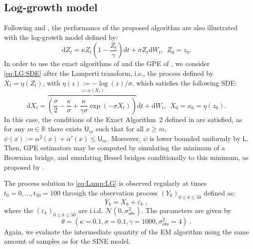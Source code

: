 \documentclass[12pt,draft]{article}
\newcommand{\rmd}{\mathrm{d}}
\newcommand{\eqsp}{\;}
\newcommand{\1}{\mathrm{1}}
\begin{document}
\subsection*{Log-growth model}
Following \cite{beskos:papaspiliopoulos:roberts:fearnhead:2006} and \cite{olsson:westerborn:2016}, the performance of the proposed algorithm are also illustrated with the log-growth model defined by:
\begin{equation}
\rmd Z_t = \kappa Z_t\left(1-\frac{Z_t}{\gamma}\right)\rmd t + \sigma Z_t \rmd W_t,~~Z_0=z_0. \label{eq:LG:SDE}
\end{equation}
In order to use the exact algorithms of \cite{beskos:papaspiliopoulos:roberts:fearnhead:2006} and the GPE of \cite{fearnhead:papaspiliopoulos:roberts:2008}, we consider  \eqref{eq:LG:SDE} after the Lamperti transform, i.e., the process defined by $X_t=\eta(Z_t)$, with $\eta(z) := -\log (z)/\sigma$,  which satisfies the following SDE:
\begin{equation}
\rmd X_t = \overbrace{\left( \frac{\sigma}{2} -  \frac{\kappa}{\sigma} + \frac{\kappa}{\gamma\sigma}\exp\left(-\sigma X_t\right)\right)}^{:=\alpha(X_t)}\rmd t +\rmd W_t,~~X_0=x_0=\eta(z_0).\label{eq:Lamp:LG}
\end{equation}
In this case, the conditions of the Exact Algorithm~2 defined in \cite{beskos:papaspiliopoulos:roberts:fearnhead:2006} are satisfied, as for any $m \in \mathbb{R}$ there exists $\mathsf{U}_m$ such that for all $x\ge m$, $\psi(x):=\alpha^2(x)+\alpha'(x) \leq \mathsf{U}_m$. Moreover, $\psi$ is lower bounded uniformly by  $\mathsf{L}$.  Then, GPE estimators may be computed by simulating the minimum of a Brownian bridge, and simulating Bessel bridges conditionally to this minimum, as proposed by \cite{beskos:papaspiliopoulos:roberts:fearnhead:2006}.

The process solution to \eqref{eq:Lamp:LG} is observed regularly at times $t_0=0,\dots,t_{50}=100$ through the observation process $(Y_k)_{0\le k\le 50}$ defined as:
\begin{equation}
Y_k = X_k + \varepsilon_k\label{eq:obs:LG}\eqsp,
\end{equation}
where the $(\varepsilon_k)_{0\le k \le 50}$ are i.i.d. $ \mathcal{N}(0,\sigma^2_{obs})$.
The parameters are given by $$\theta =(\kappa=0.1,\sigma=0.1,\gamma=1000,\sigma^2_{obs}=4)\eqsp.$$
Again, we evaluate the intermediate quantity of the EM algorithm using the same amount of samples as for the SINE model.
\end{document}
